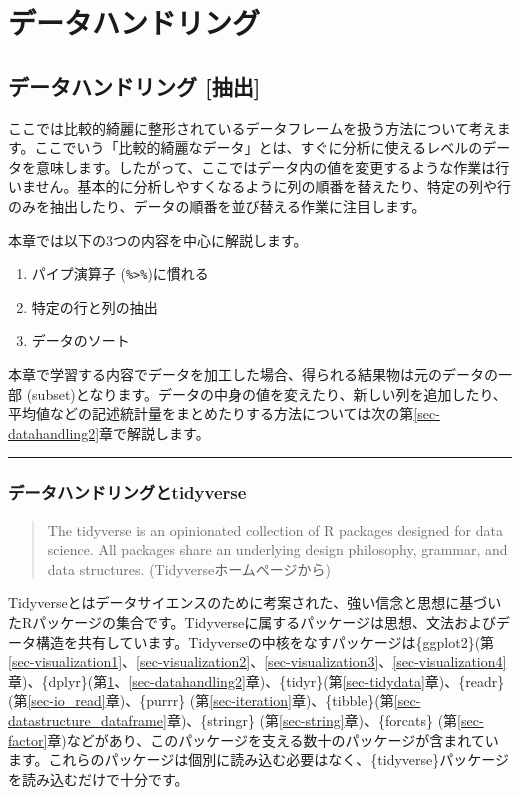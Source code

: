 \documentclass[
  a4paper,
  pandoc,
  ja=standard,
  jafont=haranoaji]{bxjsbook}
\providecommand{\tightlist}{%
  \setlength{\itemsep}{0pt}\setlength{\parskip}{0pt}}
\begin{document}
\part{データハンドリング}

\hypertarget{sec-datahandling1}{%
\chapter{データハンドリング {[}抽出{]}}\label{sec-datahandling1}}

ここでは比較的綺麗に整形されているデータフレームを扱う方法について考えます。ここでいう「比較的綺麗なデータ」とは、すぐに分析に使えるレベルのデータを意味します。したがって、ここではデータ内の値を変更するような作業は行いません。基本的に分析しやすくなるように列の順番を替えたり、特定の列や行のみを抽出したり、データの順番を並び替える作業に注目します。

本章では以下の3つの内容を中心に解説します。

\begin{enumerate}
\def\labelenumi{\arabic{enumi}.}
\tightlist
\item
  パイプ演算子 (\texttt{\%\textgreater{}\%})に慣れる
\item
  特定の行と列の抽出
\item
  データのソート
\end{enumerate}

本章で学習する内容でデータを加工した場合、得られる結果物は元のデータの一部
(subset)となります。データの中身の値を変えたり、新しい列を追加したり、平均値などの記述統計量をまとめたりする方法については次の第\ref{sec-datahandling2}章で解説します。

\begin{center}\rule{0.5\linewidth}{0.5pt}\end{center}

\hypertarget{sec-handling1_intro}{%
\section{データハンドリングとtidyverse}\label{sec-handling1_intro}}

\begin{quote}
The tidyverse is an opinionated collection of R packages designed for
data science. All packages share an underlying design philosophy,
grammar, and data structures. (Tidyverseホームページから)
\end{quote}

Tidyverseとはデータサイエンスのために考案された、強い信念と思想に基づいたRパッケージの集合です。Tidyverseに属するパッケージは思想、文法およびデータ構造を共有しています。Tidyverseの中核をなすパッケージは\{ggplot2\}(第\ref{sec-visualization1}、\ref{sec-visualization2}、\ref{sec-visualization3}、\ref{sec-visualization4}章)、\{dplyr\}(第\ref{sec-datahandling1}、\ref{sec-datahandling2}章)、\{tidyr\}(第\ref{sec-tidydata}章)、\{readr\}(第\ref{sec-io_read}章)、\{purrr\}
(第\ref{sec-iteration}章)、\{tibble\}(第\ref{sec-datastructure_dataframe}章)、\{stringr\}
(第\ref{sec-string}章)、\{forcats\}
(第\ref{sec-factor}章)などがあり、このパッケージを支える数十のパッケージが含まれています。これらのパッケージは個別に読み込む必要はなく、\{tidyverse\}パッケージを読み込むだけで十分です。
\end{document}

